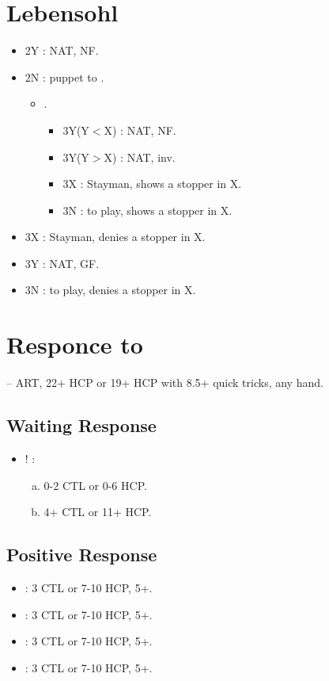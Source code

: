 \documentclass[12pt,twoside,a5paper]{report}%
\begin{document}
\chapter*{Lebensohl}
	\begin{itemize}
	\renewcommand{\labelitemi}{}
	\item 2Y : NAT, NF.
	\item 2N : puppet to .
		\begin{itemize}
		\renewcommand{\labelitemi}{--}
		\item {}.
			\begin{itemize}
				\item 3Y(Y$<$X) : NAT, NF.
				\item 3Y(Y$>$X) : NAT, inv.
				\item 3X : Stayman, shows a stopper in X.
				\item 3N : to play, shows a stopper in X.
			\end{itemize}
		\end{itemize}
	\item 3X : Stayman, denies a stopper in X.
	\item 3Y : NAT, GF.
	\item 3N : to play, denies a stopper in X.
	\end{itemize}

\chapter*{Responce to }
	-- ART, 22+ HCP or 19+ HCP with 8.5+ quick tricks, any hand.
	\section*{Waiting Response}
		\begin{itemize}
		\renewcommand{\labelitemi}{}
			\item {}! : 
				\begin{enumerate}[(a)]
				\item 0-2 CTL or 0-6 HCP.
				\item 4+ CTL or 11+ HCP.
				\end{enumerate}
		\end{itemize}

	\section*{Positive Response}
		\begin{itemize}
		\renewcommand{\labelitemi}{}
			\item {} : 3 CTL or 7-10 HCP, 5+\he{}.
			\item {} : 3 CTL or 7-10 HCP, 5+\sp{}.
			\item {} : 3 CTL or 7-10 HCP, 5+\cl{}.
			\item {} : 3 CTL or 7-10 HCP, 5+\di{}.
		\end{itemize}
\end{document}
